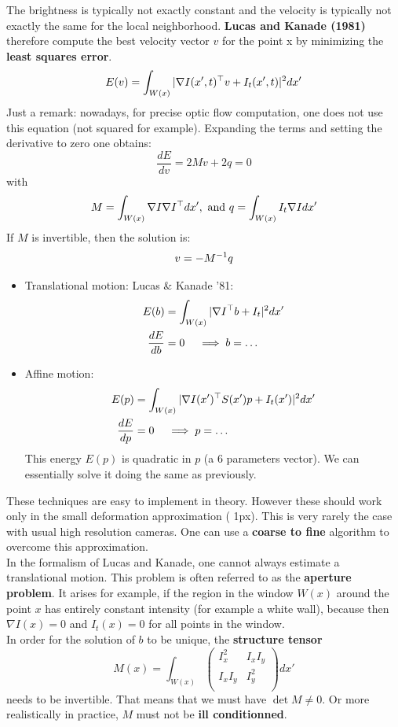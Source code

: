 The brightness is typically not exactly constant and the velocity
is typically not exactly the same for the local neighborhood.
\textbf{Lucas and Kanade (1981)} therefore compute the best velocity
vector $v$ for the point x by minimizing the \textbf{least squares error}.
\[
	E(v) = \int_{W(x)} | \nabla I(x',t)^{\top}v + I_t(x',t) | ^2 dx'
\]
Just a remark: nowadays, for precise optic flow computation,
one does not use this equation (not squared for example).
Expanding the terms and setting the derivative to zero one obtains:
\[
	\frac{dE}{dv} = 2 M v + 2 q = 0
\]
with
\[
	M = \int_{W(x)} \nabla I \nabla I^{\top} dx',\ \text{and} \
	q = \int_{W(x)} I_t \nabla I dx'
\]
If $M$ is invertible, then the solution is:
\[
	v = - M^{-1}q
\]
\begin{itemize}
	\item Translational motion: Lucas \& Kanade '81:
		\begin{align*}
			E(b) &= \int_{W(x)} | \nabla I^{\top} b + I_t |^2 dx' \\
			\frac{dE}{db} &= 0 \quad \implies b = \ldots
		\end{align*}
	\item Affine motion:
		\begin{align*}
			E(p) &= \int_{W(x)} | \nabla I(x')^{\top} S(x')p + I_t(x') |^2 dx' \\
			\frac{dE}{dp} &= 0 \quad \implies p = \ldots
		\end{align*}
		This energy $E(p)$ is quadratic in $p$ (a 6 parameters vector).
		We can essentially solve it doing the same as previously.
\end{itemize}

These techniques are easy to implement in theory.
However these should work only in the small deformation approximation (\roughly{} 1px).
This is very rarely the case with usual high resolution cameras.
One can use a \textbf{coarse to fine} algorithm to overcome this approximation.\\

In the formalism of Lucas and Kanade, one cannot always estimate a translational
motion. This problem is often referred to as the \textbf{aperture problem}.
It arises for example, if the region in the window $W(x)$ around the point $x$
has entirely constant intensity (for example a white wall),
because then $\nabla I(x) = 0$ and $I_t(x) = 0$ for all points in the window.\\

In order for the solution of $b$ to be unique, the \textbf{structure tensor}
\[
	M(x) = \int_{W(x)} \begin{pmatrix}
		I_x^2 & I_x I_y \\
		I_x I_y & I_y^2 \\
	\end{pmatrix} dx'
\]
needs to be invertible.
That means that we must have $\det M \neq 0$.
Or more realistically in practice, $M$ must not be \textbf{ill conditionned}.\\

